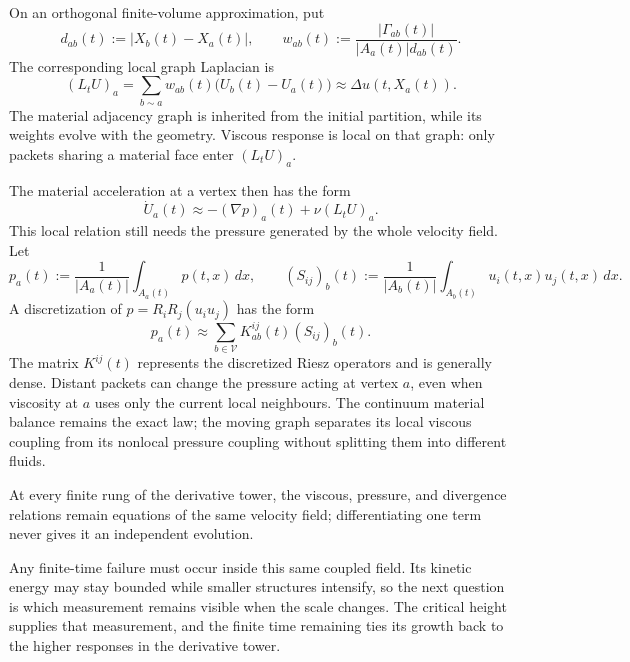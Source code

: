 On an orthogonal finite-volume approximation, put
\[
  d_{ab}(t):=|X_b(t)-X_a(t)|,
  \qquad
  w_{ab}(t)
  :=
  \frac{|\Gamma_{ab}(t)|}{|A_a(t)|d_{ab}(t)}.
\]
The corresponding local graph Laplacian is
\[
  (L_tU)_a
  =
  \sum_{b\sim a}
  w_{ab}(t)\bigl(U_b(t)-U_a(t)\bigr)
  \approx
  \Delta u(t,X_a(t)).
\]
The material adjacency graph is inherited from the initial partition, while its weights evolve with the geometry.
Viscous response is local on that graph: only packets sharing a material face enter \((L_tU)_a\).

The material acceleration at a vertex then has the form
\[
  \dot U_a(t)
  \approx
  -(\nabla p)_a(t)
  +
  \nu(L_tU)_a.
\]
This local relation still needs the pressure generated by the whole velocity field.
Let
\[
  p_a(t)
  :=
  \frac{1}{|A_a(t)|}
  \int_{A_a(t)}p(t,x)\,dx,
  \qquad
  (S_{ij})_b(t)
  :=
  \frac{1}{|A_b(t)|}
  \int_{A_b(t)}u_i(t,x)u_j(t,x)\,dx.
\]
A discretization of \(p=R_iR_j(u_i u_j)\) has the form
\[
  p_a(t)
  \approx
  \sum_{b\in\mathcal V}
  K_{ab}^{ij}(t)
  (S_{ij})_b(t).
\]
The matrix \(K^{ij}(t)\) represents the discretized Riesz operators and is generally dense.
Distant packets can change the pressure acting at vertex \(a\), even when viscosity at \(a\) uses only the current local neighbours.
The continuum material balance remains the exact law; the moving graph separates its local viscous coupling from its nonlocal pressure coupling without splitting them into different fluids.

At every finite rung of the derivative tower, the viscous, pressure, and divergence relations remain equations of the same velocity field; differentiating one term never gives it an independent evolution.

Any finite-time failure must occur inside this same coupled field.
Its kinetic energy may stay bounded while smaller structures intensify, so the next question is which measurement remains visible when the scale changes.
The critical height supplies that measurement, and the finite time remaining ties its growth back to the higher responses in the derivative tower.

